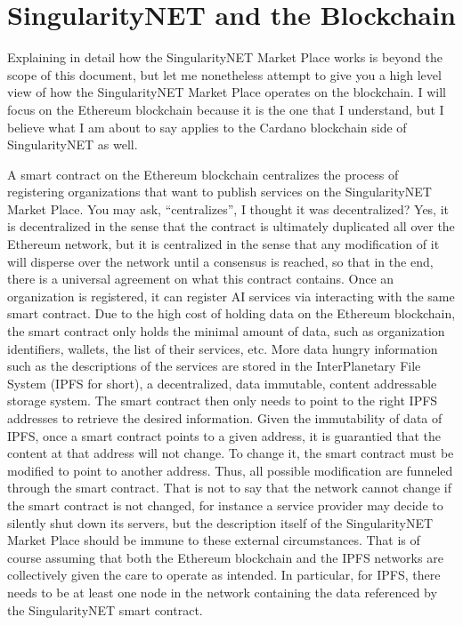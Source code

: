 \documentclass[]{report}
\begin{document}
\section{SingularityNET and the Blockchain}
Explaining in detail how the SingularityNET Market Place works is
beyond the scope of this document, but let me nonetheless attempt to
give you a high level view of how the SingularityNET Market Place
operates on the blockchain.  I will focus on the Ethereum blockchain
because it is the one that I understand, but I believe what I am about
to say applies to the Cardano blockchain side of SingularityNET as
well.

A smart contract on the Ethereum blockchain centralizes the process of
registering organizations that want to publish services on the
SingularityNET Market Place.  You may ask, ``centralizes'', I thought
it was decentralized?  Yes, it is decentralized in the sense that the
contract is ultimately duplicated all over the Ethereum network, but
it is centralized in the sense that any modification of it will
disperse over the network until a consensus is reached, so that in the
end, there is a universal agreement on what this contract contains.
Once an organization is registered, it can register AI services via
interacting with the same smart contract.  Due to the high cost of
holding data on the Ethereum blockchain, the smart contract only holds
the minimal amount of data, such as organization identifiers, wallets,
the list of their services, etc.  More data hungry information such as
the descriptions of the services are stored in the InterPlanetary File
System (IPFS for short), a decentralized, data immutable, content
addressable storage system.  The smart contract then only needs to
point to the right IPFS addresses to retrieve the desired information.
Given the immutability of data of IPFS, once a smart contract points
to a given address, it is guarantied that the content at that address
will not change.  To change it, the smart contract must be modified to
point to another address.  Thus, all possible modification are
funneled through the smart contract.  That is not to say that the
network cannot change if the smart contract is not changed, for
instance a service provider may decide to silently shut down its
servers, but the description itself of the SingularityNET Market Place
should be immune to these external circumstances.  That is of course
assuming that both the Ethereum blockchain and the IPFS networks are
collectively given the care to operate as intended.  In particular,
for IPFS, there needs to be at least one node in the network
containing the data referenced by the SingularityNET smart contract.
\end{document}
